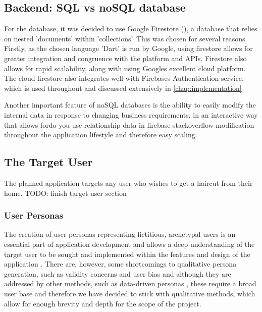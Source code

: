 \documentclass[12pt]{article}
\begin{document}
	\subsection{Backend: SQL vs noSQL database}
	For the database, it was decided to use Google Firestore (\cite{CloudFirestoreFirebase}), a  database that relies on  nested 'documents' within 'collections'. This was chosen for several reasons. Firstly, as the chosen language 'Dart' is run by Google, using firestore allows for greater integration and congruence with the platform and APIs. Firestore also allows for rapid scalability, along with using Googles excellent cloud platform. The cloud firestore also integrates well with Firebases Authentication service, which is used throughout and discussed extensively in \autoref{chap:implementation}
	
	Another important feature of noSQL databases is the ability to easily modify the internal data in response to changing business requirements, in an interactive way that allows fordo you use relationship data in firebase stackoverflow modification throughout the application lifestyle and therefore easy scaling.
	
	

	
	
	\subsection{The Target User}
	\label{chap:target-user}
	The planned application targets any user who wishes to get a haircut from their home.
	TODO: finish target user section 

	
	
	\subsubsection{User Personas}
	\label{user-personas}
	The creation of user personas representing fictitious, archetypal users is an essential part of application development \cite{PDFPersonasParticipatory} and allows a deep understanding of the target user to be sought and implemented within the features and design of the application \cite{arnowitzChapter15Wireframe2007}. There are, however, some shortcomings to qualitative persona generation, such as validity concerns and user bias \cite{chapmanPersonasNewClothes2005} and although they are addressed by other methods, such as data-driven personas \cite{mcginnDatadrivenPersonaDevelopment2008}, these require a broad user base and therefore we have decided to stick with qualitative methods, which allow for enough brevity and depth for the scope of the project.
	
\end{document}
